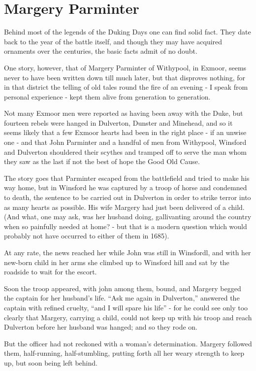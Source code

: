 \chapter{Margery Parminter}

Behind most of the legends of the Duking Days one can find solid fact. They date back to the year of the battle itself, and though they may have acquired ornaments over the centuries, the basic facts admit of no doubt.

One story, however, that of Margery Parminter of Withypool, in Exmoor, seems never to have been written down till much later, but that disproves nothing, for in that district the telling of old tales round the fire of an evening - I speak from personal experience - kept them alive from generation to generation.

Not many Exmoor men were reported as having been away with the Duke, but fourteen rebels were hanged in Dulverton, Dunster and Minehead, and so it seems likely that a few Exmoor hearts had been in the right place - if an unwise one - and that John Parminter and a handful of men from Withypool, Winsford and Dulverton shouldered their scythes and tramped off to serve the man whom they saw as the last if not the best of hope the Good Old Cause.

The story goes that Parminter escaped from the battlefield and tried to make his way home, but in Winsford he was captured by a troop of horse and condemned to death, the sentence to be carried out in Dulverton in order to strike terror into as many hearts as possible.
His wife Margery had just been delivered of a child. (And what, one may ask, was her husband doing, gallivanting around the country when so painfully needed at home? - but that is a modern question which would probably not have occurred to either of them in 1685).

At any rate, the news reached her while John was still in Winsfordl, and with her new-born child in her arms she climbed up to Winsford hill and sat by the roadside to wait for the escort.

Soon the troop appeared, with john among them, bound, and Margery begged the captain for her husband’s life. “Ask me again in Dulverton,” answered the captain with refined cruelty, “and I will spare his life” - for he could see only too clearly that Margery, carrying a child, could not keep up with his troop and reach Dulverton before her husband was hanged; and so they rode on.

But the officer had not reckoned with a woman’s determination. Margery followed them, half-running, half-stumbling, putting forth all her weary strength to keep up, but soon being left behind.

